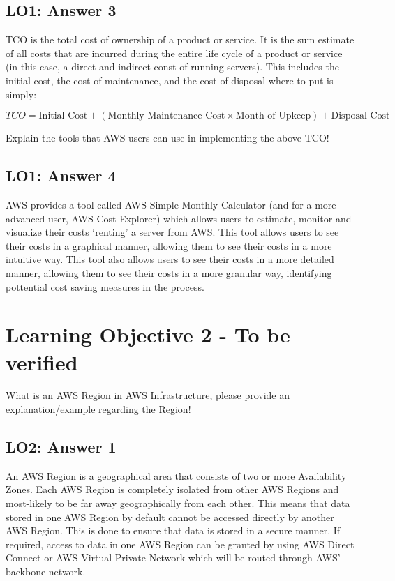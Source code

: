 \documentclass[
  11pt, %
]{assignment}
\begin{document}
\subsection*{LO1: Answer 3}

TCO is the total cost of ownership of a product or service. It is the sum estimate of all costs that are incurred during the entire life cycle of a product or service (in this case, a direct and indirect const of running servers). This includes the initial cost, the cost of maintenance, and the cost of disposal where to put is simply:

\[TCO = \text{Initial Cost} + ( \text{Monthly Maintenance Cost} \times \text{Month of Upkeep} ) + \text{Disposal Cost}\]

\begin{problem}
Explain the tools that AWS users can use in implementing the above TCO\@!
\end{problem}

\subsection*{LO1: Answer 4}

AWS provides a tool called AWS Simple Monthly Calculator (and for a more advanced user, AWS Cost Explorer) which allows users to estimate, monitor and visualize their costs `renting' a server from AWS\@. This tool allows users to see their costs in a graphical manner, allowing them to see their costs in a more intuitive way. This tool also allows users to see their costs in a more detailed manner, allowing them to see their costs in a more granular way, identifying pottential cost saving measures in the process.

\section*{Learning Objective 2 - To be verified}

\begin{problem}
What is an AWS Region in AWS Infrastructure, please provide an explanation/example regarding the Region!
\end{problem}

\subsection*{LO2: Answer 1}

An AWS Region is a geographical area that consists of two or more Availability Zones. Each AWS Region is completely isolated from other AWS Regions and most-likely to be far away geographically from each other. This means that data stored in one AWS Region by default cannot be accessed directly by another AWS Region. This is done to ensure that data is stored in a secure manner. If required, access to data in one AWS Region can be granted by using AWS Direct Connect or AWS Virtual Private Network which will be routed through AWS' backbone network.
\end{document}
